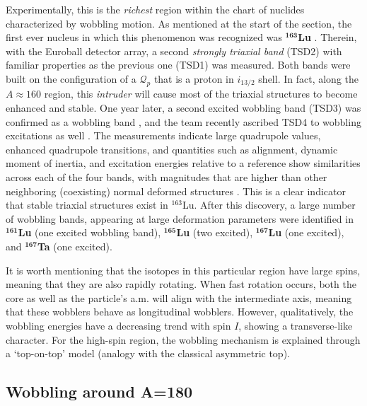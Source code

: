 Experimentally, this is the \emph{richest} region within the chart of nuclides characterized by wobbling motion. As mentioned at the start of the section, the first ever nucleus in which this phenomenon was recognized was $^\mathbf{163}$\textbf{Lu} \cite{odegaard2001evidence}. Therein, with the Euroball detector \cite{simpson1997euroball} array, a second \emph{strongly triaxial band} (TSD2) with familiar properties as the previous one (TSD1) was measured. Both bands were built on the configuration of a $\mathcal{Q}_p$ that is a proton in $i_{13/2}$ shell. In fact, along the $A\approx 160$ region, this \emph{intruder} will cause most of the triaxial structures to become enhanced and stable. One year later, a second excited wobbling band (TSD3) was confirmed as a wobbling band \cite{jensen2002evidence}, and the team recently ascribed TSD4 to wobbling excitations as well \cite{raduta2020towards}. The measurements indicate large quadrupole values, enhanced quadrupole transitions, and quantities such as alignment, dynamic moment of inertia, and excitation energies relative to a reference show similarities across each of the four bands, with magnitudes that are higher than other neighboring (coexisting) normal deformed structures \cite{jensen2004coexisting}. This is a clear indicator that stable triaxial structures exist in $^{163}$Lu. After this discovery, a large number of wobbling bands, appearing at large deformation parameters were identified in $^\mathbf{161}$\textbf{Lu} \cite{bringel2005evidence} (one excited wobbling band), $^\mathbf{165}$\textbf{Lu} \cite{schonwasser2003one} (two excited), $^\mathbf{167}$\textbf{Lu} \cite{amro2003wobbling} (one excited), and $^\mathbf{167}$\textbf{Ta} \cite{hartley2009wobbling} (one excited).

It is worth mentioning that the isotopes in this particular region have large spins, meaning that they are also rapidly rotating. When fast rotation occurs, both the core as well as the particle's a.m. will align with the intermediate axis, meaning that these wobblers behave as longitudinal wobblers. However, qualitatively, the wobbling energies have a decreasing trend with spin $I$, showing a transverse-like character. For the high-spin region, the wobbling mechanism is explained through a `top-on-top' model \cite{hamamoto2002wobbling,tanabe2006algebraic} (analogy with the classical asymmetric top).

\subsection{Wobbling around A=180}


